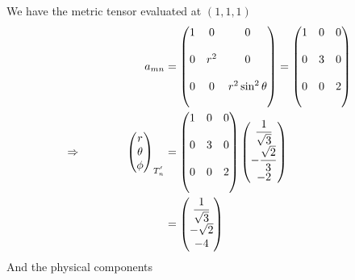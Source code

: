 We have the metric tensor evaluated at $\left(1,1,1\right)$
\begin{align}
a_{mn} &= \begin{pmatrix}
1&0&0\\\\
0&r^2&0\\\\
0&0&r^2\sin^2\theta\\\\
\end{pmatrix}=\begin{pmatrix}
1&0&0\\\\
0&3&0\\\\
0&0&2\\\\
\end{pmatrix}\\
\Rightarrow \quad\quad\quad\quad 
\begin{pmatrix}
r\\
\theta\\
\phi
\end{pmatrix}_{T^{'}_n}&=\begin{pmatrix}
1&0&0\\\\
0&3&0\\\\
0&0&2\\\\
\end{pmatrix}\begin{pmatrix}
\dfrac {1}{\sqrt{3}}\\
-\dfrac {\sqrt{2}}{3}\\
-2
\end{pmatrix}\\
&=\begin{pmatrix}
\dfrac {1}{\sqrt{3}}\\
-\sqrt{2}\\
-4
\end{pmatrix}
\end{align}
And the physical components 
